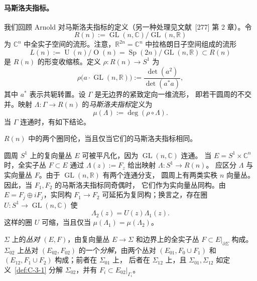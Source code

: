 \paragraph{马斯洛夫指标。}
我们回顾 Arnold 对马斯洛夫指标的定义（另一种处理见文献~[277] 第 2 章）。令
\[
  R(n):=\operatorname{GL}(n,\mathbb C)/\operatorname{GL}(n,\mathbb R)
\]
为 $\mathbb C^n$ 中全实子空间的流形。注意，$\mathbb R^{2n}=\mathbb C^n$
中拉格朗日子空间组成的流形
\[
  L(n):=\operatorname U(n)/\operatorname O(n)
  =\operatorname{Sp}(2n)/\operatorname{GL}(n,\mathbb R)\subset R(n)
\]
是 $R(n)$ 的形变收缩核。定义 $\rho:R(n)\to S^1$ 为
\[
  \rho\bigl(a\cdot\operatorname{GL}(n,\mathbb R)\bigr)
  :=\frac{\det(a^2)}{\det(a^*a)},
\]
其中 $a^*$ 表示共轭转置。设 $\Gamma$ 是无边界的紧致定向一维流形，
即若干圆周的不交并。映射 $\Lambda:\Gamma\to R(n)$ 的\emph{马斯洛夫指标}定义为
\begin{equation}\label{eq:C-3-1}
  \mu(\Lambda):=\deg(\rho\circ\Lambda).
\end{equation}
当 $\Gamma$ 连通时，有如下结论。

\begin{theorem}\label{thm:C-3-3}
$R(n)$ 中的两个圈同伦，当且仅当它们的马斯洛夫指标相同。
\end{theorem}

圆周 $S^1$ 上的复向量丛 $E$ 可被平凡化，因为 $\operatorname{GL}(n,\mathbb C)$ 连通。
当 $E=S^1\times\mathbb C^n$ 时，全实子丛 $F\subset E$ 通过
$\Lambda(z):=F_z$ 给出映射 $\Lambda:S^1\to R(n)$。
应区分 $\Lambda$ 与实向量丛 $F$。由于 $\operatorname{GL}(n,\mathbb R)$ 有两个连通分支，
圆周上有两类实秩 $n$ 向量丛。因此，当 $F_1,F_2$ 的马斯洛夫指标同奇偶时，
它们作为实向量丛同构。由 $E=F_j\oplus iF_j$，实同构 $F_1\to F_2$
可延拓为复同构；换言之，存在圈 $U:S^1\to\operatorname{GL}(n,\mathbb C)$ 使
\[
  \Lambda_2(z)=U(z)\Lambda_1(z).
\]
这样的圈 $U$ 可缩，当且仅当 $\mu(\Lambda_1)=\mu(\Lambda_2)$。

\begin{definition}\label{def:C-3-4}
$\Sigma$ 上的\emph{丛对} $(E,F)$，由复向量丛 $E\to\Sigma$ 和边界上的全实子丛
$F\subset E|_{\partial\Sigma}$ 构成。
$\Sigma_{02}$ 上丛对 $(E_{02},F_{02})$ 的一个\emph{分解}，由两个丛对
$(E_{01},F_0\cup F_1)$ 和 $(E_{12},F_1\cup F_2)$ 构成；前者在 $\Sigma_{01}$ 上，
后者在 $\Sigma_{12}$ 上，且 $\Sigma_{01},\Sigma_{12}$ 如定义~\ref{def:C-3-1}
分解 $\Sigma_{02}$，并有 $F_i\subset E_{02}|_{\Gamma_i}$。
\end{definition}

